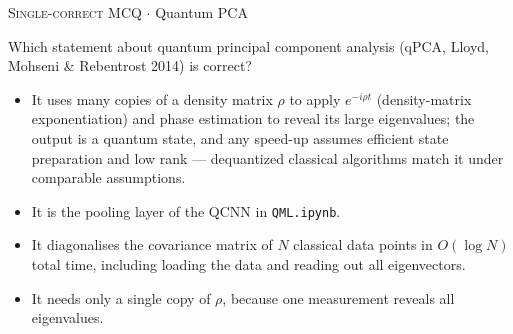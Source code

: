 \documentclass[11pt,a4paper]{article}
\newcommand{\optlabel}[1]{\textbf{(#1)}}
\newcommand{\correctlabel}[1]{\textcolor{okgreen}{\textbf{(#1)}\,\ding{51}}}
\newenvironment{qitem}[1]{\begin{list}{}{\setlength{\leftmargin}{3.3em}\setlength{\labelwidth}{3.1em}%
  \setlength{\labelsep}{0.2em}\setlength{\topsep}{3pt}\setlength{\parsep}{3pt}}\item[\textbf{Q.#1}\hfill]}{\end{list}}
\newcommand{\qmeta}[2]{{\footnotesize\color{black!60}\textsc{#1} \;$\cdot$\; #2}\par}
\begin{document}
\begin{qitem}{71}
\qmeta{Single-correct MCQ}{Quantum PCA}
Which statement about quantum principal component analysis (qPCA, Lloyd, Mohseni \& Rebentrost 2014) is correct?
\begin{itemize}[leftmargin=2.6em, labelsep=0.4em, itemsep=2pt, topsep=3pt]
\item[\correctlabel{A}] It uses many copies of a density matrix $\rho$ to apply $e^{-i\rho t}$ (density-matrix exponentiation) and phase estimation to reveal its large eigenvalues; the output is a quantum state, and any speed-up assumes efficient state preparation and low rank --- dequantized classical algorithms match it under comparable assumptions.
\item[\optlabel{B}] It is the pooling layer of the QCNN in \texttt{QML.ipynb}.
\item[\optlabel{C}] It diagonalises the covariance matrix of $N$ classical data points in $O(\log N)$ total time, including loading the data and reading out all eigenvectors.
\item[\optlabel{D}] It needs only a single copy of $\rho$, because one measurement reveals all eigenvalues.
\end{itemize}
\end{qitem}
\end{document}
